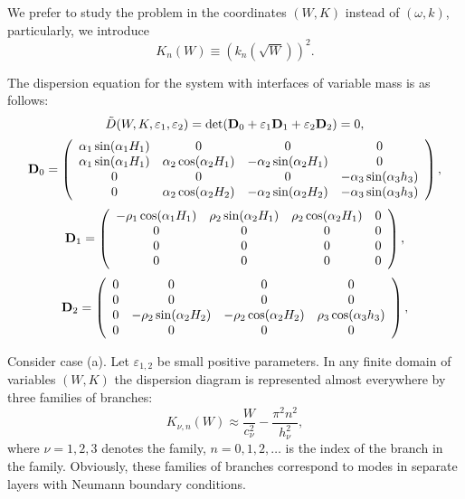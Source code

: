 \documentclass[12pt]{article}
\newcommand{\eps}{\varepsilon}
\begin{document}
We prefer to study the problem in the coordinates $(W,K)$ instead of $(\omega, k)$,
particularly, we introduce 
\[
K_n (W) \equiv (k_n (\sqrt{W}))^2.
\] 

The dispersion equation for the system with interfaces of variable mass
is as follows: 
\begin{equation}
\tilde D(W, K , \eps_1 , \eps_2) = {\rm det} ({\bf D}_0 + \eps_1 {\bf D}_1 + \eps_2 {\bf D}_2) = 0 , 
\label{eq0302}
\end{equation} 
\begin{equation}
{\bf D}_0 =
\left( \begin{array}{cccc}
 \alpha_1 \sin (\alpha_1 H_1) & 0 & 0 & 0  \\
\alpha_1 \sin (\alpha_1 H_1) & \alpha_2 \cos(\alpha_2 H_1) & -\alpha_2 \sin (\alpha_2 H_1) & 0  \\
0 & 0 & 0 &  -\alpha_3 \sin (\alpha_3 h_3) \\
0 & \alpha_2 \cos (\alpha_2 H_2) & 
-\alpha_2 \sin(\alpha_2 H_2) &  -\alpha_3 \sin (\alpha_3 h_3) 
\end{array} \right) ,
\label{eq0303}
\end{equation} 
\begin{equation}
{\bf D}_1 =
\left( \begin{array}{cccc}
-\rho_1 \cos (\alpha_1 H_1)  & \rho_2 \sin(\alpha_2 H_1) & \rho_2 \cos (\alpha_2 H_1) & 0  \\
0 & 0 & 0 & 0  \\
0 & 0 & 0 & 0 \\
0 & 0 & 0 & 0 
\end{array} \right) ,
\label{eq0304}
\end{equation} 
\begin{equation}
{\bf D}_2 =
\left( \begin{array}{cccc}
0 & 0 & 0 & 0  \\
0 & 0 & 0 & 0  \\
0 & -\rho_2 \sin (\alpha_2 H_2) & -\rho_2 \cos(\alpha_2 H_2) & \rho_3 \cos (\alpha_3 h_3) \\
0 & 0 & 0 & 0 
\end{array} \right) ,
\label{eq0305}
\end{equation} 

Consider case (a). Let $\eps_{1,2}$ be small positive parameters. In any finite domain of variables 
$(W,K)$ the dispersion diagram is represented almost everywhere by three families of branches: 
\begin{equation}
K_{\nu,n} (W) \approx \frac{W}{c_{\nu}^2} - \frac{\pi^2 n^2}{h_{\nu}^2} ,
\label{eq0306}
\end{equation}
where
$\nu = 1, 2, 3$ denotes the family, $n = 0 , 1, 2, \dots$ is the index of the branch in the 
family.
Obviously, these families of branches correspond to modes in separate layers with Neumann boundary conditions. 
\end{document}
